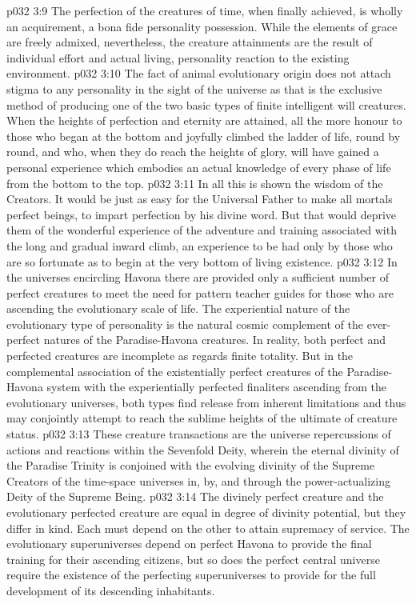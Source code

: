 \vs p032 3:9 The perfection of the creatures of time, when finally achieved, is wholly an acquirement, a bona fide personality possession. While the elements of grace are freely admixed, nevertheless, the creature attainments are the result of individual effort and actual living, personality reaction to the existing environment.
\vs p032 3:10 The fact of animal evolutionary origin does not attach stigma to any personality in the sight of the universe as that is the exclusive method of producing one of the two basic types of finite intelligent will creatures. When the heights of perfection and eternity are attained, all the more honour to those who began at the bottom and joyfully climbed the ladder of life, round by round, and who, when they do reach the heights of glory, will have gained a personal experience which embodies an actual knowledge of every phase of life from the bottom to the top.
\vs p032 3:11 In all this is shown the wisdom of the Creators. It would be just as easy for the Universal Father to make all mortals perfect beings, to impart perfection by his divine word. But that would deprive them of the wonderful experience of the adventure and training associated with the long and gradual inward climb, an experience to be had only by those who are so fortunate as to begin at the very bottom of living existence.
\vs p032 3:12 In the universes encircling Havona there are provided only a sufficient number of perfect creatures to meet the need for pattern teacher guides for those who are ascending the evolutionary scale of life. The experiential nature of the evolutionary type of personality is the natural cosmic complement of the ever\hyp{}perfect natures of the Paradise\hyp{}Havona creatures. In reality, both perfect and perfected creatures are incomplete as regards finite totality. But in the complemental association of the existentially perfect creatures of the Paradise\hyp{}Havona system with the experientially perfected finaliters ascending from the evolutionary universes, both types find release from inherent limitations and thus may conjointly attempt to reach the sublime heights of the ultimate of creature status.
\vs p032 3:13 These creature transactions are the universe repercussions of actions and reactions within the Sevenfold Deity, wherein the eternal divinity of the Paradise Trinity is conjoined with the evolving divinity of the Supreme Creators of the time\hyp{}space universes in, by, and through the power\hyp{}actualizing Deity of the Supreme Being.
\vs p032 3:14 The divinely perfect creature and the evolutionary perfected creature are equal in degree of divinity potential, but they differ in kind. Each must depend on the other to attain supremacy of service. The evolutionary superuniverses depend on perfect Havona to provide the final training for their ascending citizens, but so does the perfect central universe require the existence of the perfecting superuniverses to provide for the full development of its descending inhabitants.
